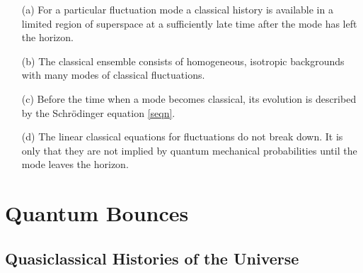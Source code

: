 \documentclass[prd,floats,superscriptaddress,eqsecnum,floatfix,nofootinbib,12pt]{revtex4}
\begin{document}
{{{{{ \begin{enumerate}
 
 \item[(a)] For a particular fluctuation mode a classical history is available in a limited region of superspace at a sufficiently late time after the mode has left the horizon.
 
 \item[(b)] The classical ensemble consists of homogeneous, isotropic backgrounds with many modes of classical fluctuations. 
 
 \item [(c)] Before the time when a mode becomes classical, its evolution is described by the Schr\"odinger equation \eqref{seqn}. 
 
 \item[(d)] The linear classical equations for fluctuations do not break down. It is only that they are not implied by quantum mechanical probabilities until the mode leaves the horizon.
 
  \end{enumerate}

}

\section{Quantum Bounces}
\label{thrubounce}

\subsection{Quasiclassical Histories of the Universe}
\label{qchistories}

}}}}
\end{document}
